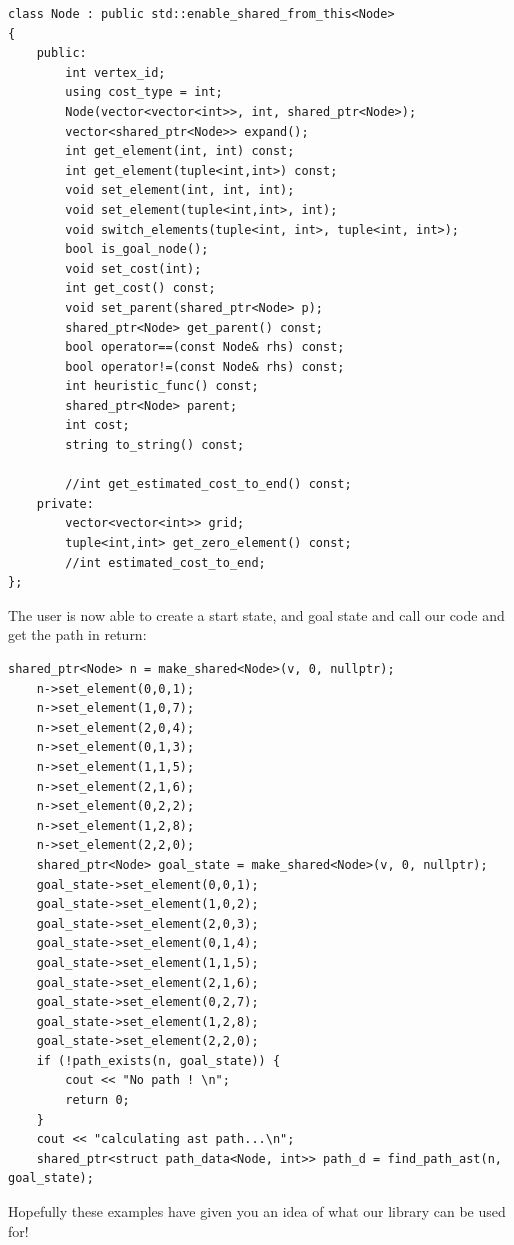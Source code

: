 \documentclass{article}
\begin{document}
\begin{lstlisting}
class Node : public std::enable_shared_from_this<Node>
{
	public:
		int vertex_id;
		using cost_type = int;
		Node(vector<vector<int>>, int, shared_ptr<Node>);
		vector<shared_ptr<Node>> expand();
		int get_element(int, int) const;
		int get_element(tuple<int,int>) const;
		void set_element(int, int, int);
		void set_element(tuple<int,int>, int);
		void switch_elements(tuple<int, int>, tuple<int, int>);
		bool is_goal_node();
		void set_cost(int);
		int get_cost() const;
		void set_parent(shared_ptr<Node> p);
		shared_ptr<Node> get_parent() const;
		bool operator==(const Node& rhs) const;
		bool operator!=(const Node& rhs) const;
		int heuristic_func() const;
		shared_ptr<Node> parent;
		int cost;
		string to_string() const;

		//int get_estimated_cost_to_end() const;
	private:
		vector<vector<int>> grid;
		tuple<int,int> get_zero_element() const;
		//int estimated_cost_to_end;
};

\end{lstlisting}
The user is now able to create a start state, and goal state and call our code and get the path in return:

\begin{lstlisting}
shared_ptr<Node> n = make_shared<Node>(v, 0, nullptr);
	n->set_element(0,0,1);
	n->set_element(1,0,7);
	n->set_element(2,0,4);
	n->set_element(0,1,3);
	n->set_element(1,1,5);
	n->set_element(2,1,6);
	n->set_element(0,2,2);
	n->set_element(1,2,8);
	n->set_element(2,2,0);
	shared_ptr<Node> goal_state = make_shared<Node>(v, 0, nullptr);
	goal_state->set_element(0,0,1);
	goal_state->set_element(1,0,2);
	goal_state->set_element(2,0,3);
	goal_state->set_element(0,1,4);
	goal_state->set_element(1,1,5);
	goal_state->set_element(2,1,6);
	goal_state->set_element(0,2,7);
	goal_state->set_element(1,2,8);
	goal_state->set_element(2,2,0);
	if (!path_exists(n, goal_state)) {
		cout << "No path ! \n";
		return 0;
	}
	cout << "calculating ast path...\n";
	shared_ptr<struct path_data<Node, int>> path_d = find_path_ast(n, goal_state);
\end{lstlisting}

Hopefully these examples have given you an idea of what our library can be used for!
\end{document}
